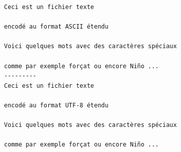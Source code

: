 \documentclass[11pt,a4paper]{article}
\begin{document}
\begin{center}
\begin{minipage}{11cm}
\begin{verbatim}
Ceci est un fichier texte

encodé au format ASCII étendu

Voici quelques mots avec des caractères spéciaux

comme par exemple forçat ou encore Niño ...
---------
Ceci est un fichier texte

encodé au format UTF-8 étendu

Voici quelques mots avec des caractères spéciaux

comme par exemple forçat ou encore Niño ...
\end{verbatim}
\end{minipage}
\end{center}
\end{document}
